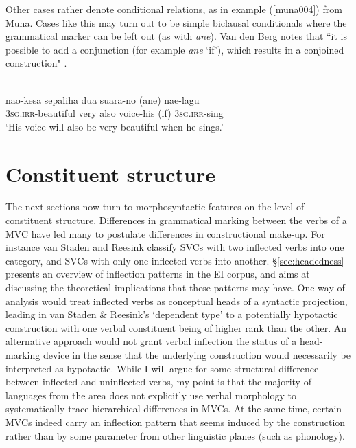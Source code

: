 Other cases rather denote conditional relations, as in example (\ref{muna004}) from Muna. Cases like this may turn out to be simple biclausal conditionals where the grammatical marker can be left out (as with \textit{ane}). Van den Berg notes that ``it is possible to add a conjunction (for example \textit{ane} `if'), which results in a conjoined construction" \citep[235]{vandenberg1989}.

\ea \label{muna004}
\\
\gll nao-kesa sepaliha dua suara-no (ane) nae-lagu \\
3\textsc{sg}.\textsc{irr}-beautiful very also voice-his (if) 3\textsc{sg}.\textsc{irr}-sing \\
\glft `His voice will also be very beautiful when he sings.'\\ 
\z

\section{Constituent structure}

The next sections now turn to morphosyntactic features on the level of constituent structure. Differences in grammatical marking between the verbs of a MVC have led many to postulate differences in constructional make-up. For instance van Staden and Reesink classify SVCs with two inflected verbs into one category, and SVCs with only one inflected verbs into another. §\ref{sec:headedness} presents an overview of inflection patterns in the EI corpus, and aims at discussing the theoretical implications that these patterns may have. One way of analysis would treat inflected verbs as conceptual heads of a syntactic projection, leading in van Staden \& Reesink's `dependent type' to a potentially hypotactic construction with one verbal constituent being of higher rank than the other. An alternative approach would not grant verbal inflection the status of a head-marking device in the sense that the underlying construction would necessarily be interpreted as hypotactic. While I will argue for some structural difference between inflected and uninflected verbs, my point is that the majority of languages from the area does not explicitly use verbal morphology to systematically trace hierarchical differences in MVCs. At the same time, certain MVCs indeed carry an inflection pattern that seems induced by the construction rather than by some parameter from other linguistic planes (such as phonology).


